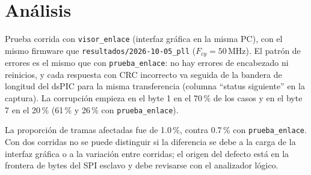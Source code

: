 \section{Análisis}

Prueba corrida con \texttt{visor\_enlace} (interfaz gráfica en la misma PC),
con el mismo firmware que \texttt{resultados/2026-10-05\_pll}
($F_{cy} = 50$\,MHz). El patrón de errores es el mismo que con
\texttt{prueba\_enlace}: no hay errores de encabezado ni reinicios, y cada
respuesta con CRC incorrecto va seguida de la bandera de longitud del dsPIC
para la misma transferencia (columna ``status siguiente'' en la captura). La
corrupción empieza en el byte 1 en el 70\,\% de los casos y en el byte 7 en
el 20\,\% (61\,\% y 26\,\% con \texttt{prueba\_enlace}).

La proporción de tramas afectadas fue de 1.0\,\%, contra 0.7\,\% con
\texttt{prueba\_enlace}. Con dos corridas no se puede distinguir si la
diferencia se debe a la carga de la interfaz gráfica o a la variación entre
corridas; el origen del defecto está en la frontera de bytes del SPI esclavo
y debe revisarse con el analizador lógico.
